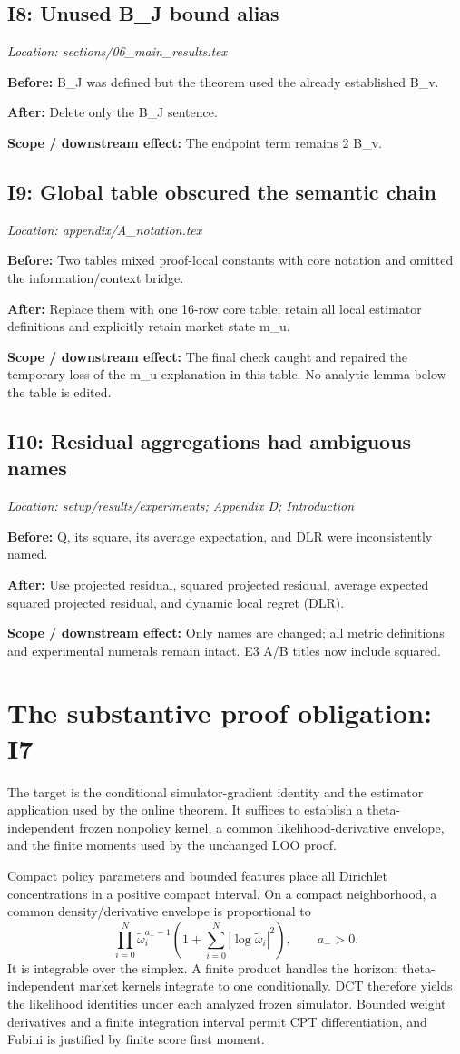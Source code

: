 \documentclass[10pt]{article}
\newcommand{\before}[1]{\par\noindent\textcolor{before}{\textbf{Before:}} #1\par}
\newcommand{\after}[1]{\par\noindent\textcolor{after}{\textbf{After:}} #1\par}
\newcommand{\scope}[1]{\par\noindent\textcolor{scope}{\textbf{Scope / downstream effect:}} #1\par}
\begin{document}
\subsection*{I8: Unused B\_J bound alias}
\noindent\textit{Location: sections/06\_main\_results.tex}
\before{B\_J was defined but the theorem used the already established B\_v.}
\after{Delete only the B\_J sentence.}
\scope{The endpoint term remains 2 B\_v.}
\subsection*{I9: Global table obscured the semantic chain}
\noindent\textit{Location: appendix/A\_notation.tex}
\before{Two tables mixed proof-local constants with core notation and omitted the information/context bridge.}
\after{Replace them with one 16-row core table; retain all local estimator definitions and explicitly retain market state m\_u.}
\scope{The final check caught and repaired the temporary loss of the m\_u explanation in this table. No analytic lemma below the table is edited.}
\subsection*{I10: Residual aggregations had ambiguous names}
\noindent\textit{Location: setup/results/experiments; Appendix D; Introduction}
\before{Q, its square, its average expectation, and DLR were inconsistently named.}
\after{Use projected residual, squared projected residual, average expected squared projected residual, and dynamic local regret (DLR).}
\scope{Only names are changed; all metric definitions and experimental numerals remain intact. E3 A/B titles now include squared.}

\section*{The substantive proof obligation: I7}
The target is the conditional simulator-gradient identity and the estimator application used by the online theorem. It suffices to establish a theta-independent frozen nonpolicy kernel, a common likelihood-derivative envelope, and the finite moments used by the unchanged LOO proof.

Compact policy parameters and bounded features place all Dirichlet concentrations in a positive compact interval. On a compact neighborhood, a common density/derivative envelope is proportional to
\[
\prod_{i=0}^{N}\widetilde\omega_i^{a_- -1}
\left(1+\sum_{i=0}^{N}|\log\widetilde\omega_i|^2\right),\qquad a_->0.
\]
It is integrable over the simplex. A finite product handles the horizon; theta-independent market kernels integrate to one conditionally. DCT therefore yields the likelihood identities under each analyzed frozen simulator. Bounded weight derivatives and a finite integration interval permit CPT differentiation, and Fubini is justified by finite score first moment.
\end{document}
